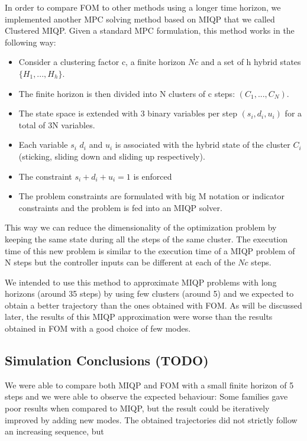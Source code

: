 \documentclass[12,twoside]{TFG-GM}
\theoremstyle{definition}
\theoremstyle{remark}
\begin{document}
In order to compare FOM to other methods using a longer time horizon, we implemented another MPC solving method based on MIQP that we called Clustered MIQP. Given a standard MPC formulation, this method works in the following way:

\begin{itemize}
\item Consider a clustering factor c, a finite horizon $ N c$ and a set of h hybrid states $ \{ H_1, ..., H_h \}$.
\item The finite horizon is then divided into N clusters of c steps: $(C_1, ..., C_N)$.
\item The state space is extended with 3 binary variables per step $(s_i, d_i, u_i)$ for a total of 3N variables.
\item Each variable $s_i$ $d_i$ and $u_i$ is associated with the hybrid state of the cluster $C_i$ (sticking, sliding down and sliding up respectively).
\item The constraint $s_i + d_i + u_i = 1$ is enforced 
\item The problem constraints are formulated with big M notation or indicator constraints and the problem is fed into an MIQP solver.
\end{itemize}

This way we can reduce the dimensionality of the optimization problem by keeping the same state during all the steps of the same cluster. The execution time of this new problem is similar to the execution time of a MIQP problem of N steps but the controller inputs can be different at each of the $N c$ steps.

We intended to use this method to approximate MIQP problems with long horizons (around 35 steps) by using few clusters (around 5) and we expected to obtain a better trajectory than the ones obtained with FOM. As will be discussed later, the results of this MIQP approximation were worse than the results obtained in FOM with a good choice of few modes.

\subsection{Simulation Conclusions (TODO)}
\label{subsec:simresults}

We were able to compare both MIQP and FOM with a small finite horizon of 5 steps and we were able to observe the expected behaviour: Some families gave poor results when compared to MIQP, but the result could be iteratively improved by adding new modes. The obtained trajectories did not strictly follow an increasing sequence, but 
\end{document}
